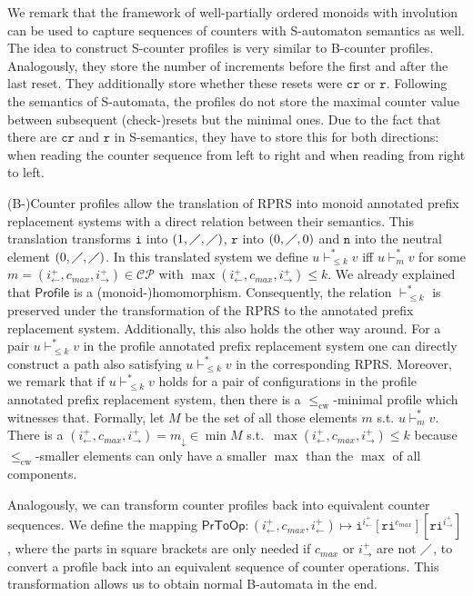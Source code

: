\documentclass{LMCS}
\newcommand{\cprofile}{\mathsf{Profile}}
\newcommand{\counterProfiles}{\mathcal{CP}}
\newcommand{\cple}{\le_{\mathrm{cw}}}
\newcommand{\ipl}{i^{+}_{\leftarrow}}
\newcommand{\ipr}{i^{+}_{\rightarrow}}
\newcommand{\cmax}{c_{\mathit{max}}}
\newcommand{\na}{\diagup}
\newcommand{\configstepsCost}[2][*]{\vdash^{#1}_{#2}}
\newcommand{\configstepsLesserCost}[2][*]{\vdash^{#1}_{\le #2}}
\newcommand{\iOp}{\ensuremath{\mathtt{i}}}
\newcommand{\rOp}{\ensuremath{\mathtt{r}}}
\newcommand{\nOp}{\ensuremath{\mathtt{n}}}
\newcommand{\crOp}{\ensuremath{\mathtt{c\! r}}}
\newcommand{\profileToOp}{\mathsf{PrToOp}}
\newcommand{\RPRS}{\textsf{RPRS}}
\begin{document}
We remark that the framework of well-partially ordered monoids with involution
can be used to capture sequences of counters with S-automaton semantics as well.
The idea to construct S-counter profiles is very similar to B-counter profiles.
Analogously, they store the number of increments before the first and after
the last reset. They additionally store whether these resets were $\crOp$ or
$\rOp$. Following the semantics of S-automata, the profiles do not store the
maximal counter value between subsequent (check-)resets but the minimal ones. 
Due to the fact that there are $\crOp$ and $\rOp$ in S-semantics, they have 
to store this for both directions: when reading the counter sequence from 
left to right and when reading from right to left.


(B-)Counter profiles allow the translation of \RPRS{} into monoid annotated prefix
replacement systems with a direct relation between their semantics. This
translation transforms $\iOp$ into $(1,\na,\na)$, $\rOp$ into
$(0,\na,0)$ and $\nOp$ into the neutral element $(0,\na,\na)$. In this
translated system we define $u \configstepsLesserCost{k} v$ iff $u
\configstepsCost{m} v$ for some $m = (\ipl,\cmax,\ipr) \in \counterProfiles$
with $\max(\ipl,\cmax,\ipr) \le k$. We already explained that $\cprofile$ is a
\mbox{(monoid-)}homomorphism. Consequently, the relation
$\configstepsLesserCost{k}$ is preserved under the transformation of the \RPRS{}
to the annotated prefix replacement system. Additionally, this also holds the
other way around. For a pair $u \configstepsLesserCost{k} v$ in the profile
annotated prefix replacement system one can directly construct a path also
satisfying $u \configstepsLesserCost{k} v$ in the corresponding \RPRS{}.
Moreover, we remark that if $u \configstepsLesserCost{k} v$ holds for a pair of
configurations in the profile annotated prefix replacement system, then there is
a $\cple$-minimal profile which witnesses that. Formally, let $M$ be the set of
all those elements $m$ s.t. $u \configstepsCost{m} v$. There is a
$(\ipl,\cmax,\ipr) = m_{\downarrow} \in \min M$ s.t.\ $\max(\ipl,\cmax,\ipr) \le
k$ because $\cple$-smaller elements can only have a smaller $\max$ than the
$\max$ of all components. 

Analogously, we can transform counter profiles back into equivalent counter
sequences. We define the mapping $\profileToOp: (\ipl,\cmax,\ipl) \mapsto
\iOp^{\ipl}[\rOp\iOp^{\cmax}][\rOp\iOp^{\ipr}]$, where the parts in square
brackets are only needed if $\cmax$ or $\ipr$ are not $\na$, to convert a 
profile back into an equivalent sequence of counter operations. This 
transformation allows us to obtain normal B-automata in the end.
\end{document}
